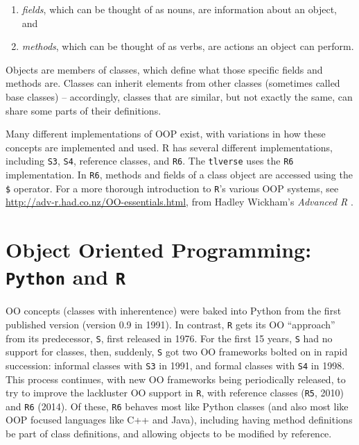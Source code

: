 \documentclass[12pt, krantz2,]{book}
\providecommand{\tightlist}{%
  \setlength{\itemsep}{0pt}\setlength{\parskip}{0pt}}
\theoremstyle{definition}
\theoremstyle{definition}
\theoremstyle{definition}
\newcommand{\1}{\mathbbm{1}}
\begin{document}
\begin{enumerate}
\def\labelenumi{\arabic{enumi}.}
\tightlist
\item
  \emph{fields}, which can be thought of as nouns, are information about an object,
  and
\item
  \emph{methods}, which can be thought of as verbs, are actions an object can
  perform.
\end{enumerate}

Objects are members of classes, which define what those specific fields and
methods are. Classes can inherit elements from other classes (sometimes called
base classes) -- accordingly, classes that are similar, but not exactly the
same, can share some parts of their definitions.

Many different implementations of OOP exist, with variations in how these
concepts are implemented and used. R has several different implementations,
including \texttt{S3}, \texttt{S4}, reference classes, and \texttt{R6}. The \texttt{tlverse} uses the \texttt{R6}
implementation. In \texttt{R6}, methods and fields of a class object are accessed using
the \texttt{\$} operator. For a more thorough introduction to \texttt{R}'s various OOP systems,
see \url{http://adv-r.had.co.nz/OO-essentials.html}, from Hadley Wickham's \emph{Advanced
R} \citep{wickham2014advanced}.

\hypertarget{object-oriented-programming-python-and-r}{%
\section{\texorpdfstring{Object Oriented Programming: \texttt{Python} and \texttt{R}}{Object Oriented Programming: Python and R}}\label{object-oriented-programming-python-and-r}}

OO concepts (classes with inherentence) were baked into Python from the first
published version (version 0.9 in 1991). In contrast, \texttt{R} gets its OO ``approach''
from its predecessor, \texttt{S}, first released in 1976. For the first 15 years, \texttt{S}
had no support for classes, then, suddenly, \texttt{S} got two OO frameworks bolted on
in rapid succession: informal classes with \texttt{S3} in 1991, and formal classes with
\texttt{S4} in 1998. This process continues, with new OO frameworks being periodically
released, to try to improve the lackluster OO support in \texttt{R}, with reference
classes (\texttt{R5}, 2010) and \texttt{R6} (2014). Of these, \texttt{R6} behaves most like Python
classes (and also most like OOP focused languages like C++ and Java), including
having method definitions be part of class definitions, and allowing objects to
be modified by reference.



\backmatter
\printindex
\end{document}
